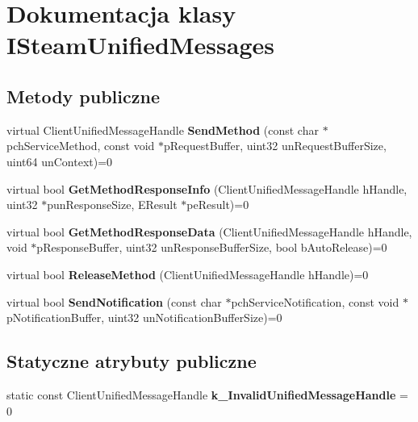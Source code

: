 \hypertarget{class_i_steam_unified_messages}{}\section{Dokumentacja klasy I\+Steam\+Unified\+Messages}
\label{class_i_steam_unified_messages}
\subsection*{Metody publiczne}
\begin{DoxyCompactItemize}
\item 
\mbox{\label{class_i_steam_unified_messages_a555de624350230b3293e707b2ec2a3c7}} 
virtual Client\+Unified\+Message\+Handle {\bfseries Send\+Method} (const char $\ast$pch\+Service\+Method, const void $\ast$p\+Request\+Buffer, uint32 un\+Request\+Buffer\+Size, uint64 un\+Context)=0
\item 
\mbox{\label{class_i_steam_unified_messages_a7923af78997437cfe9f4d817e4202676}} 
virtual bool {\bfseries Get\+Method\+Response\+Info} (Client\+Unified\+Message\+Handle h\+Handle, uint32 $\ast$pun\+Response\+Size, E\+Result $\ast$pe\+Result)=0
\item 
\mbox{\label{class_i_steam_unified_messages_ac86c79fcd0b915c9c53e439465a01630}} 
virtual bool {\bfseries Get\+Method\+Response\+Data} (Client\+Unified\+Message\+Handle h\+Handle, void $\ast$p\+Response\+Buffer, uint32 un\+Response\+Buffer\+Size, bool b\+Auto\+Release)=0
\item 
\mbox{\label{class_i_steam_unified_messages_ac421c5bede8ca1584edb180f847efe48}} 
virtual bool {\bfseries Release\+Method} (Client\+Unified\+Message\+Handle h\+Handle)=0
\item 
\mbox{\label{class_i_steam_unified_messages_a5ae1153298d137900122426dbaad1d98}} 
virtual bool {\bfseries Send\+Notification} (const char $\ast$pch\+Service\+Notification, const void $\ast$p\+Notification\+Buffer, uint32 un\+Notification\+Buffer\+Size)=0
\end{DoxyCompactItemize}
\subsection*{Statyczne atrybuty publiczne}
\begin{DoxyCompactItemize}
\item 
\mbox{\label{class_i_steam_unified_messages_a0d86aa3c7b9cccfc0b08553b893be2d9}} 
static const Client\+Unified\+Message\+Handle {\bfseries k\+\_\+\+Invalid\+Unified\+Message\+Handle} = 0
\end{DoxyCompactItemize}


